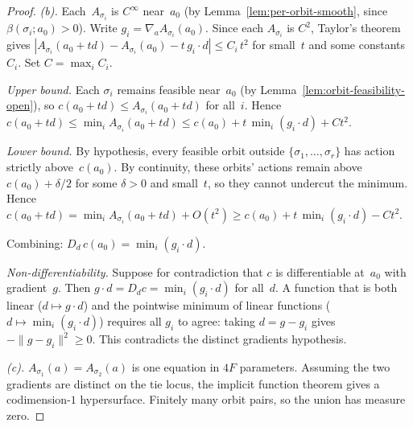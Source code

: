 \begin{unverified}
\begin{proof}
\emph{(b).}
Each~$A_{\sigma_i}$ is $C^\infty$ near~$a_0$
(by Lemma~\ref{lem:per-orbit-smooth},
since $\beta(\sigma_i; a_0) > 0$).
Write $g_i = \nabla_a A_{\sigma_i}(a_0)$.
Since each $A_{\sigma_i}$ is $C^2$, Taylor's theorem gives
$|A_{\sigma_i}(a_0 + td) - A_{\sigma_i}(a_0) - t\, g_i \cdot d|
\leq C_i\, t^2$ for small~$t$ and some constants~$C_i$.
Set $C = \max_i C_i$.

\emph{Upper bound.}
Each $\sigma_i$ remains feasible near~$a_0$
(by Lemma~\ref{lem:orbit-feasibility-open}), so
$c(a_0 + td) \leq A_{\sigma_i}(a_0 + td)$ for all~$i$.
Hence $c(a_0 + td) \leq \min_i A_{\sigma_i}(a_0 + td)
\leq c(a_0) + t\,\min_i(g_i \cdot d) + Ct^2$.

\emph{Lower bound.}
By hypothesis, every feasible orbit outside
$\{\sigma_1, \ldots, \sigma_r\}$ has action strictly
above~$c(a_0)$.
By continuity, these orbits' actions remain
above $c(a_0) + \delta/2$ for some $\delta > 0$
and small~$t$, so they cannot undercut the minimum.
Hence $c(a_0 + td) = \min_i A_{\sigma_i}(a_0 + td) + O(t^2)
\geq c(a_0) + t\,\min_i(g_i \cdot d) - Ct^2$.

Combining: $D_d\, c(a_0) = \min_i (g_i \cdot d)$.

\emph{Non-differentiability.}
Suppose for contradiction that $c$ is differentiable at~$a_0$
with gradient~$g$.
Then $g \cdot d = D_d c = \min_i (g_i \cdot d)$ for all~$d$.
A function that is both linear ($d \mapsto g \cdot d$)
and the pointwise minimum of linear functions
($d \mapsto \min_i(g_i \cdot d)$) requires all $g_i$ to
agree: taking $d = g - g_i$ gives $-\|g - g_i\|^2 \geq 0$.
This contradicts the distinct gradients hypothesis.

\emph{(c).}
$A_{\sigma_1}(a) = A_{\sigma_2}(a)$ is one equation in $4F$ parameters.
Assuming the two gradients are distinct on the tie locus,
the implicit function theorem gives a codimension-$1$
hypersurface. Finitely many orbit pairs, so the union has
measure zero.
\end{proof}
\end{unverified}


%

